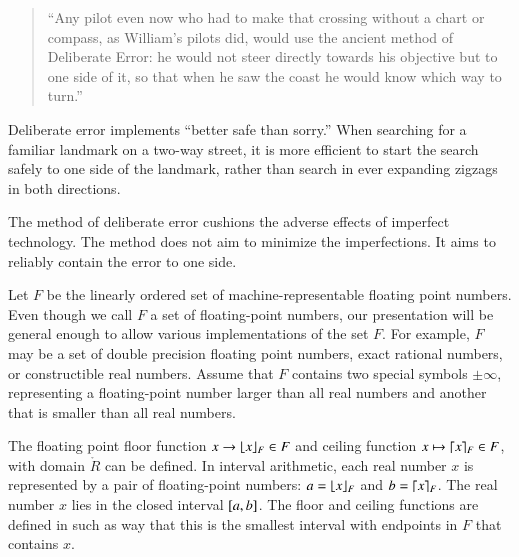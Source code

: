 \begin{quote}
  ``Any pilot even now who had to make that crossing without a chart
  or compass, as William's pilots did, would use the ancient method of
  Deliberate Error: he would not steer directly towards his objective
  but to one side of it, so that when he saw the coast he would know
  which way to turn.'' \cite[p81]{How81}
\end{quote}

Deliberate error implements ``better safe than sorry.''
When searching for a familiar landmark
on a two-way street, it is more efficient  
to start the search safely to one side of the landmark, 
rather than search in ever
expanding zigzags in both directions.  


The method of deliberate error cushions the adverse effects of
imperfect technology.  The method does not aim to minimize the
imperfections.  It aims to reliably contain the error to one side.


Let $F$ be the linearly ordered set of machine-representable floating
point numbers.  Even though we call $F$ a set of floating-point
numbers, our presentation will be general enough to allow various
implementations of the set $F$.  For example, $F$ may be a set of
double precision floating point numbers, exact rational numbers, or
constructible real numbers.  Assume that $F$ contains two special
symbols $\pm\infty$, representing a floating-point number larger than
all real numbers and another that is smaller than all real numbers.

The floating point floor function $x\to\lfloor x\rfloor_F\in
F$ and ceiling function $x\mapsto\lceil x\rceil_F\in F$, with domain
$\ring{R}$ can be defined.  In interval arithmetic, each real number
$x$ is represented by a pair of floating-point numbers:
$a=\lfloor x\rfloor_F$ and $b=\lceil x\rceil_F$. The real number $x$ lies in the
closed interval $[ a,b]$.  The floor and ceiling
functions are defined in such as way that this is the smallest interval with
endpoints in $F$ that contains $x$.

